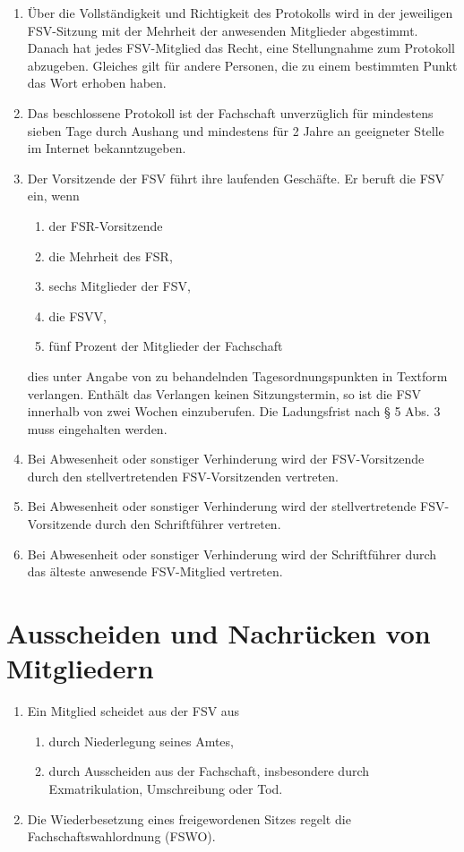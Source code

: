 \documentclass{article}
\begin{document}
\begin{enumerate}[(1)]
	\item Über die Vollständigkeit und Richtigkeit des Protokolls wird in der jeweiligen FSV-Sitzung mit der Mehrheit der anwesenden Mitglieder abgestimmt. Danach hat jedes FSV-Mitglied das Recht, eine Stellungnahme zum Protokoll abzugeben. Gleiches gilt für andere Personen, die zu einem bestimmten Punkt das Wort erhoben haben.
	\item Das beschlossene Protokoll ist der Fachschaft
    unverzüglich für mindestens sieben Tage durch Aushang und mindestens für 2 Jahre an geeigneter Stelle im Internet bekanntzugeben.
	\item Der Vorsitzende der FSV führt ihre laufenden Geschäfte. Er beruft die FSV ein, wenn
	\begin{enumerate}[1.]
	    \item der FSR-Vorsitzende
        \item die Mehrheit des FSR,
		\item sechs Mitglieder der FSV,
		\item die FSVV,
		\item fünf Prozent der Mitglieder der Fachschaft 
	\end{enumerate}
	dies unter Angabe von zu behandelnden Tagesordnungspunkten in Textform verlangen. Enthält das Verlangen keinen Sitzungstermin, so ist die FSV innerhalb von zwei Wochen einzuberufen. Die Ladungsfrist nach § 5 Abs. 3 muss eingehalten werden.
	\item Bei Abwesenheit oder sonstiger Verhinderung wird der FSV-Vorsitzende durch den stellvertretenden FSV-Vorsitzenden vertreten.
	\item Bei Abwesenheit oder sonstiger Verhinderung wird der stellvertretende FSV-Vorsitzende durch den Schriftführer vertreten.
	\item Bei Abwesenheit oder sonstiger Verhinderung wird der Schriftführer durch das älteste anwesende FSV-Mitglied vertreten.
\end{enumerate}

\section{Ausscheiden und Nachrücken von Mitgliedern}
\begin{enumerate}[(1)]
    \item Ein Mitglied scheidet aus der FSV aus
    	\begin{enumerate}[1.]
	    \item durch Niederlegung seines Amtes,
        \item durch Ausscheiden aus der Fachschaft, insbesondere durch Exmatrikulation, Umschreibung oder Tod.
	\end{enumerate}
	\item Die Wiederbesetzung eines freigewordenen Sitzes regelt die Fachschaftswahlordnung (FSWO). 
\end{enumerate}
\end{document}
